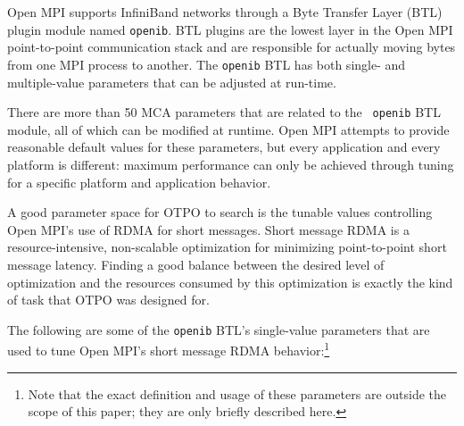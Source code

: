 \label{sec:motivation}

Open MPI supports InfiniBand networks through a Byte Transfer Layer
(BTL) plugin module named {\tt openib}.  BTL plugins are the lowest
layer in the Open MPI point-to-point communication stack and are
responsible for actually moving bytes from one MPI process to
another.  The {\tt openib} BTL has both single- and multiple-value
parameters that can be adjusted at run-time.


There are more than 50 MCA parameters that are related to the {\tt
  openib} BTL module, all of which can be modified at runtime.  Open
MPI attempts to provide reasonable default values for these
parameters, but every application and every platform is different:
maximum performance can only be achieved through tuning for a specific
platform and application behavior.

A good parameter space for OTPO to search is the tunable values
controlling Open MPI's use of RDMA for short messages.  Short message
RDMA is a resource-intensive, non-scalable optimization for minimizing
point-to-point short message latency.  Finding a good balance between
the desired level of optimization and the resources consumed by this
optimization is exactly the kind of task that OTPO was designed for.

The following are some of the {\tt openib} BTL's single-value
parameters that are used to tune Open MPI's short message RDMA
behavior:\footnote{Note that the exact definition and usage of these
  parameters are outside the scope of this paper; they are only
  briefly described here.}

